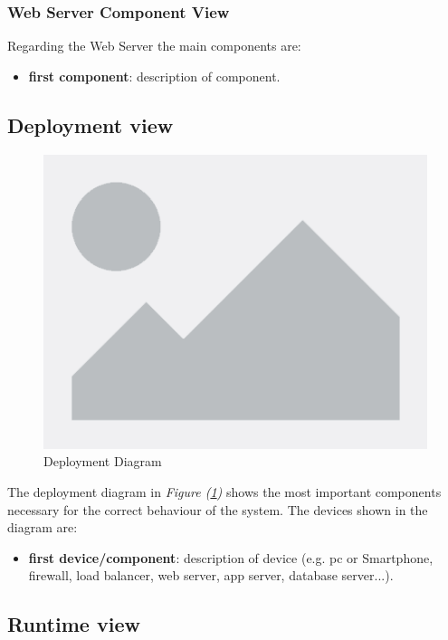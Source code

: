 \documentclass[table, 12pt]{article}
\begin{document}
\subsubsection*{Web Server Component View}
Regarding the Web Server the main components are:
\begin{itemize}
    \item \textbf{first component}: description of component.
\end{itemize}

\newpage

\subsection{Deployment view}
\begin{center}
    \begin{figure}[H]
        \includegraphics[scale=0.45, center]{assets/placeholder.png}
        \caption{Deployment Diagram}
        \label{fig: deployment_diagram}
    \end{figure}
\end{center}

The deployment diagram in \textit{Figure (\ref{fig: deployment_diagram})} shows the most important components necessary for the correct behaviour of the system.
The devices shown in the diagram are:
\begin{itemize}
    \item \textbf{first device/component}: description of device (e.g. pc or Smartphone, firewall, load balancer, web server, app server, database server...).
\end{itemize}
\newpage

\subsection{Runtime view}
\end{document}
